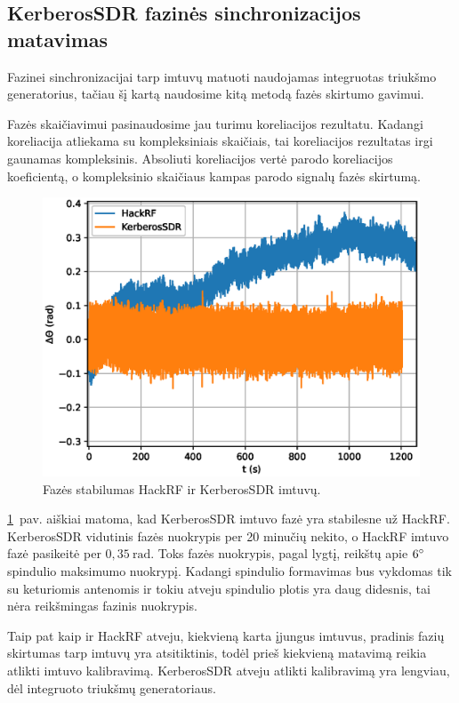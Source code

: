 \documentclass[main.tex]{subfiles}
\begin{document}
\subsection{KerberosSDR fazinės sinchronizacijos matavimas}\label{sec:phase_stability_sdr}

Fazinei sinchronizacijai tarp imtuvų matuoti naudojamas integruotas triukšmo generatorius,
tačiau šį kartą naudosime kitą metodą fazės skirtumo gavimui.

Fazės skaičiavimui pasinaudosime jau turimu koreliacijos rezultatu. Kadangi koreliacija
atliekama su kompleksiniais skaičiais, tai koreliacijos rezultatas irgi gaunamas kompleksinis.
Absoliuti koreliacijos vertė parodo koreliacijos koeficientą, o kompleksinio skaičiaus kampas
parodo signalų fazės skirtumą.

\begin{figure}[h]
    \begin{centering}
    \includegraphics[scale=1.0]{drawings/hackrdf_vs_kerberos_phase_over_time.eps}
    \par\end{centering}
    \protect\caption{\label{fig:phase_stability}Fazės stabilumas HackRF ir KerberosSDR imtuvų.}
\end{figure}

\ref{fig:phase_stability}~pav. aiškiai matoma, kad KerberosSDR imtuvo fazė yra 
stabilesne už HackRF. KerberosSDR vidutinis fazės nuokrypis per 20 minučių nekito,
o HackRF imtuvo fazė pasikeitė per $0,35\ \mathrm{rad}$. Toks fazės nuokrypis, pagal
 lygtį, reikštų apie $6\degree$ spindulio maksimumo nuokrypį.
Kadangi spindulio formavimas bus vykdomas tik su keturiomis antenomis ir tokiu atveju
spindulio plotis yra daug didesnis, tai nėra reikšmingas fazinis nuokrypis.

Taip pat kaip ir HackRF atveju, kiekvieną karta įjungus imtuvus, pradinis fazių skirtumas
tarp imtuvų yra atsitiktinis, todėl prieš kiekvieną matavimą reikia atlikti imtuvo kalibravimą.
KerberosSDR atveju atlikti kalibravimą yra lengviau, dėl integruoto triukšmų generatoriaus.
\end{document}
